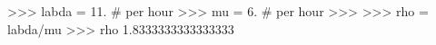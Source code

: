 
>>> labda = 11. # per hour
>>> mu = 6. # per hour
>>>
>>> rho = labda/mu
>>> rho
1.8333333333333333

